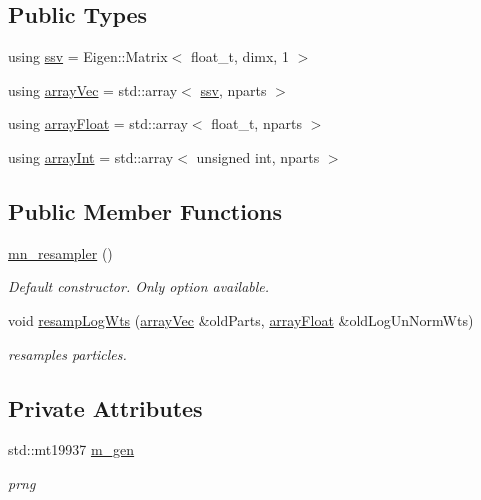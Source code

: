 \subsection*{Public Types}
\begin{DoxyCompactItemize}
\item 
using \hyperlink{classmn__resampler_a1cb075b42f73e01de7fc1b27f51bfc4c}{ssv} = Eigen\+::\+Matrix$<$ float\+\_\+t, dimx, 1 $>$
\item 
using \hyperlink{classmn__resampler_aa8ff37576399807b14a7a12615032bb1}{array\+Vec} = std\+::array$<$ \hyperlink{classrbase_ae20e0b8df15aa109252f57ecbf1f20f8}{ssv}, nparts $>$
\item 
using \hyperlink{classmn__resampler_ae26be2889cf3cd4ddea66928d879809e}{array\+Float} = std\+::array$<$ float\+\_\+t, nparts $>$
\item 
using \hyperlink{classmn__resampler_afb5d000e2464afef813792c57c42599b}{array\+Int} = std\+::array$<$ unsigned int, nparts $>$
\end{DoxyCompactItemize}
\subsection*{Public Member Functions}
\begin{DoxyCompactItemize}
\item 
\mbox{\label{classmn__resampler_afcb296db505c5d2bcdba4e00ae9d6672}} 
\hyperlink{classmn__resampler_afcb296db505c5d2bcdba4e00ae9d6672}{mn\+\_\+resampler} ()
\begin{DoxyCompactList}\small\item\em Default constructor. Only option available. \end{DoxyCompactList}\item 
void \hyperlink{classmn__resampler_a13b1897e180a791a3a099d5d6329a125}{resamp\+Log\+Wts} (\hyperlink{classrbase_aa12fc826befa6ba0647b5f59ebc396ee}{array\+Vec} \&old\+Parts, \hyperlink{classrbase_a6f76bef853e508cb5b6f546d231b06f5}{array\+Float} \&old\+Log\+Un\+Norm\+Wts)
\begin{DoxyCompactList}\small\item\em resamples particles. \end{DoxyCompactList}\end{DoxyCompactItemize}
\subsection*{Private Attributes}
\begin{DoxyCompactItemize}
\item 
\mbox{\label{classmn__resampler_a565f3bdfb2e7ccba217292c20a2afb6a}} 
std\+::mt19937 \hyperlink{classmn__resampler_a565f3bdfb2e7ccba217292c20a2afb6a}{m\+\_\+gen}
\begin{DoxyCompactList}\small\item\em prng \end{DoxyCompactList}\end{DoxyCompactItemize}


